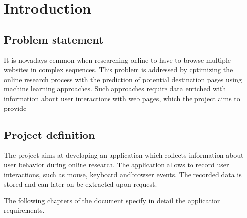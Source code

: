 \chapter{Introduction}
\label{ch:introduction}

\section{Problem statement}
It is nowadays common when researching online to have to browse multiple websites in complex sequences. This problem is addressed by optimizing the online research process with the prediction of potential destination pages using machine learning approaches. Such approaches require data enriched with information about \gls{user} interactions with web pages, which the project aims to provide.


\section{Project definition}
The project aims at developing an application which collects information about \gls{user} behavior during online research. The application allows to record \gls{user} interactions, such as mouse, keyboard and\gls{browser} events. The recorded data is stored and can later on be extracted upon request. 

The following chapters of the document specify in detail the application requirements.
